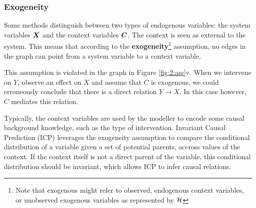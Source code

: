 \subsubsection{Exogeneity}

Some methods distinguish between two types of endogenous variables: the system variables $\bm{X}$ and the context variables $\bm{C}$. The context is seen as external to the system. This means that according to the \textbf{exogeneity}\footnote{Note that exogenous might refer to observed, endogenous context variables, or unobserved exogenous variables as represented by $\mathcal{H}$} assumption, no edges in the graph can point from a system variable to a context variable. 

This assumption is violated in the graph in Figure \ref{fig:2:ass}v. When we intervene on $Y$, observe an effect on $X$ and assume that $C$ is exogenous, we could erroneously conclude that there is a direct relation $Y\to X$. In this case however, $C$ mediates this relation.

Typically, the context variables are used by the modeller to encode some causal background knowledge, such as the type of intervention. Invariant Causal Prediction (ICP) leverages the exogeneity assumption to compare the conditional distribution of a variable given a set of potential parents, accross values of the context. If the context itself is not a direct parent of the variable, this conditional distribution should be invariant, which allows ICP to infer causal relations. 


\label{sec:back:meth}